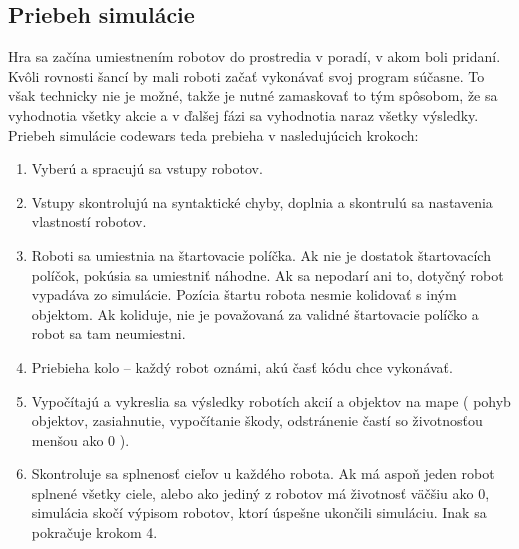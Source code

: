 \subsection {Priebeh simulácie}
Hra sa začína umiestnením robotov do prostredia v poradí, v akom boli pridaní. Kvôli rovnosti šancí by mali roboti začať vykonávať svoj program súčasne. To však technicky nie je možné, takže je nutné zamaskovať to tým spôsobom, že sa vyhodnotia všetky akcie a v ďalšej fázi sa vyhodnotia naraz všetky výsledky. \\
 Priebeh simulácie codewars teda prebieha v nasledujúcich krokoch:
\begin {enumerate}
\item Vyberú a spracujú sa vstupy robotov.
\item Vstupy skontrolujú na syntaktické chyby, doplnia a skontrulú sa nastavenia vlastností robotov.
\item Roboti sa umiestnia na štartovacie políčka. Ak nie je dostatok štartovacích políčok, pokúsia sa umiestniť náhodne. Ak sa nepodarí ani to, dotyčný robot vypadáva zo simulácie. Pozícia štartu robota nesmie kolidovať s iným objektom. Ak koliduje, nie je považovaná za validné štartovacie políčko a robot sa tam neumiestni.
\item Priebieha kolo – každý robot oznámi, akú časť kódu chce vykonávať. 
\item Vypočítajú a vykreslia sa výsledky robotích akcií a objektov na mape ( pohyb objektov, zasiahnutie, vypočítanie škody, odstránenie častí so životnosťou menšou ako 0 ).
\item Skontroluje sa splnenosť cieľov u každého robota. Ak má aspoň jeden robot splnené všetky ciele, alebo ako jediný z robotov má životnosť väčšiu ako 0, simulácia skočí výpisom robotov, ktorí úspešne ukončili simuláciu. Inak sa pokračuje krokom 4.
\end{enumerate}

